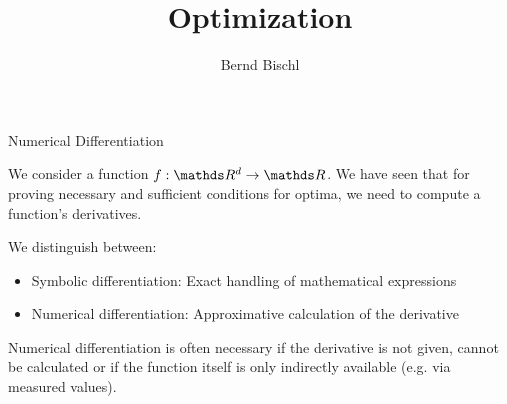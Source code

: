 





\newcommand{\titlefigure}{figure_man/hinge_vs_l2.pdf}
\newcommand{\learninggoals}{
\item Mathematical vs. Numerical Error
\item Derivative-based vs. Derivative-free}



\title{Optimization}
\author{Bernd Bischl}
\date{}



\sloppy

\begin{vbframe}{Numerical Differentiation}   

  We consider a function $f: \R^d \rightarrow \R$. We have seen that for proving necessary and sufficient conditions for optima, we need to compute a function's derivatives. 
  
  \lz 
  
  We distinguish between: 
  
  \begin{itemize}
  \item Symbolic differentiation: Exact handling of mathematical expressions
  \item Numerical differentiation: Approximative calculation of the derivative
  \end{itemize}
  
  Numerical differentiation is often necessary if the derivative is not given, cannot be calculated or if the function itself is only indirectly available (e.g. via measured values).
  
  \end{vbframe}
  

